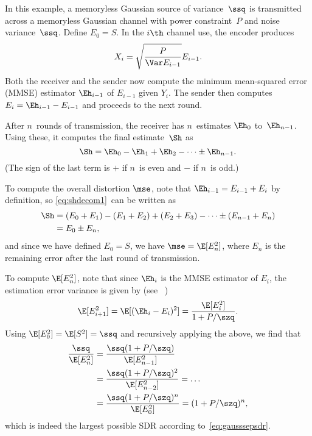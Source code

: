 \begin{example}
  \label{ex:gaussfb}
  In this example, a memoryless Gaussian source of variance~$\ssq$ is
  transmitted across a memoryless Gaussian channel with power constraint~$P$ and
  noise variance~$\ssq$.  Define $E_0 = S$. In the $i\th$ channel use, the
  encoder produces
  \begin{equation}
    \label{eq:gaussfbxi}
    X_i = \sqrt{\frac{P}{\Var E_{i-1}}} E_{i-1}.
  \end{equation}
  Both the receiver and the sender now compute the minimum mean-squared
  error (MMSE) estimator $\Eh_{i-1}$ of $E_{i-1}$ given $Y_i$. The sender then
  computes $E_i = \Eh_{i-1} - E_{i-1}$ and proceeds to the next round.

  After $n$~rounds of transmission, the receiver has $n$~estimates $\Eh_0$
  to~$\Eh_{n-1}$. Using these, it computes the final estimate~$\Sh$ as
  \begin{equation}
    \label{eq:shdecom1}
    \Sh = \Eh_0 - \Eh_1 + \Eh_2 - \cdots \pm \Eh_{n-1}.
  \end{equation}
  (The sign of the last term is $+$ if $n$~is even and $-$ if $n$~is odd.)

  To compute the overall distortion $\mse$, note that $\Eh_{i-1} = E_{i-1} +
  E_i$ by definition, so \eqref{eq:shdecom1}~can be written as
  \begin{align*}
    \Sh &= (E_0 + E_1) - (E_1 + E_2) + (E_2 + E_3) - \cdots \pm (E_{n-1} + E_n)
    \\
    &= E_0 \pm E_n,
  \end{align*}
  and since we have defined $E_0 = S$, we have $\mse = \E[E_n^2]$, where $E_n$
  is the remaining error after the last round of transmission.

  To compute $\E[E_n^2]$, note that since $\Eh_i$ is the MMSE estimator of
  $E_i$, the estimation error variance is given by (see
  \eg~\cite[Section~8.3]{Scharf1990})
  \begin{equation}
    \label{eq:gaussvardec}
    \E[E_{i+1}^2] = \E[(\Eh_i - E_i)^2] = \frac{\E[E_i^2]}{1 + P/\szq}.
  \end{equation}
  Using $\E[E_0^2] = \E[S^2] = \ssq$ and recursively applying the above, we find
  that
  \begin{align*}
    \frac{\ssq}{\E[E_n^2]} &= \frac{\ssq (1 + P/\szq)}{\E[E_{n-1}^2]} \\
    &= \frac{\ssq(1 + P/\szq)^2}{\E[E_{n-2}^2]} = \dots \\
    &= \frac{\ssq(1 + P/\szq)^n}{\E[E_0^2]} = (1 + P/\szq)^n,
  \end{align*}
  which is indeed the largest possible SDR according to~\eqref{eq:gausssepsdr}.
\end{example}


